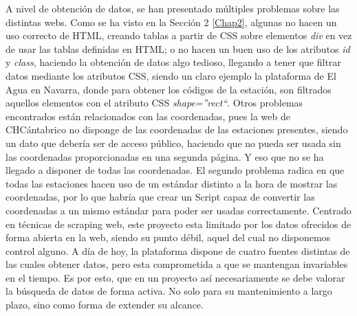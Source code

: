 \newline
A nivel de obtención de datos, se han presentado múltiples problemas sobre las distintas webs. Como se ha visto en la Sección 2 \ref{Chap2}, algunas no hacen un uso correcto de HTML, creando tablas a partir de CSS sobre elementos \textit{div} en vez de usar las tablas definidas en HTML; o no hacen un buen uso de los atributos \textit{id} y \textit{class}, haciendo la obtención de datos algo tedioso, llegando a tener que filtrar datos mediante los atributos CSS, siendo un claro ejemplo la plataforma de El Agua en Navarra, donde para obtener los códigos de la estación, son filtrados aquellos elementos con el atributo CSS \textit{shape=''rect``}.\newline
\newline
Otros problemas encontrados están relacionados con las coordenadas, pues la web de CHCántabrico no disponge de las coordenadas de las estaciones presentes, siendo un dato que debería ser de acceso público, haciendo que no pueda ser usada sin las coordenadas proporcionadas en una segunda página. Y eso que no se ha llegado a disponer de todas las coordenadas. El segundo problema radica en que todas las estaciones hacen uso de un estándar distinto a la hora de mostrar las coordenadas, por lo que habría que crear un Script capaz de convertir las coordenadas a un mismo estándar para poder ser usadas correctamente.\newline
\newline
Centrado en técnicas de scraping web, este proyecto esta limitado por los datos ofrecidos de forma abierta en la web, siendo su punto débil, aquel del cual no disponemos control alguno. A día de hoy, la plataforma dispone de cuatro fuentes distintas de las cuales obtener datos, pero esta comprometida a que se mantengan invariables en el tiempo. Es por esto, que en un proyecto así necesariamente se debe valorar la búsqueda de datos de forma activa. No solo para su mantenimiento a largo plazo, sino como forma de extender su alcance.\newline
\newline